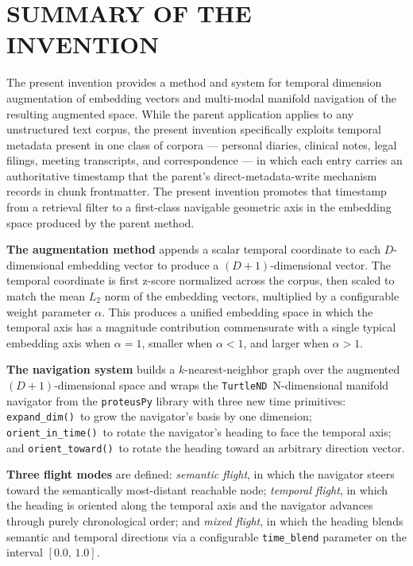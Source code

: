 \documentclass[12pt,letterpaper]{article}
\newcommand{\turtlend}{\texttt{TurtleND}}
\newcommand{\expanddim}{\texttt{expand\_dim()}}
\newcommand{\orientintime}{\texttt{orient\_in\_time()}}
\newcommand{\orienttoward}{\texttt{orient\_toward()}}
\newcommand{\alphabar}{$\alpha$}
\begin{document}
\section*{SUMMARY OF THE INVENTION}

The present invention provides a method and system for temporal dimension
augmentation of embedding vectors and multi-modal manifold navigation of the
resulting augmented space. While the parent application applies to any
unstructured text corpus, the present invention specifically exploits temporal
metadata present in one class of corpora --- personal diaries, clinical notes,
legal filings, meeting transcripts, and correspondence --- in which each entry
carries an authoritative timestamp that the parent's direct-metadata-write
mechanism records in chunk frontmatter. The present invention promotes that
timestamp from a retrieval filter to a first-class navigable geometric axis in
the embedding space produced by the parent method.

\textbf{The augmentation method} appends a scalar temporal coordinate to each
$D$-dimensional embedding vector to produce a $(D+1)$-dimensional vector. The
temporal coordinate is first z-score normalized across the corpus, then scaled
to match the mean $L_2$ norm of the embedding vectors, multiplied by a
configurable weight parameter \alphabar. This produces a unified embedding space
in which the temporal axis has a magnitude contribution commensurate with a
single typical embedding axis when $\alpha = 1$, smaller when $\alpha < 1$, and
larger when $\alpha > 1$.

\textbf{The navigation system} builds a $k$-nearest-neighbor graph over the
augmented $(D+1)$-dimensional space and wraps the \turtlend\ N-dimensional
manifold navigator from the \texttt{proteusPy} library with three new time
primitives: \expanddim\ to grow the navigator's basis by one dimension;
\orientintime\ to rotate the navigator's heading to face the temporal axis; and
\orienttoward\ to rotate the heading toward an arbitrary direction vector.

\textbf{Three flight modes} are defined: \emph{semantic flight}, in which the
navigator steers toward the semantically most-distant reachable node; \emph{temporal
flight}, in which the heading is oriented along the temporal axis and the
navigator advances through purely chronological order; and \emph{mixed flight},
in which the heading blends semantic and temporal directions via a configurable
\texttt{time\_blend} parameter on the interval $[0.0,\, 1.0]$.
\end{document}
